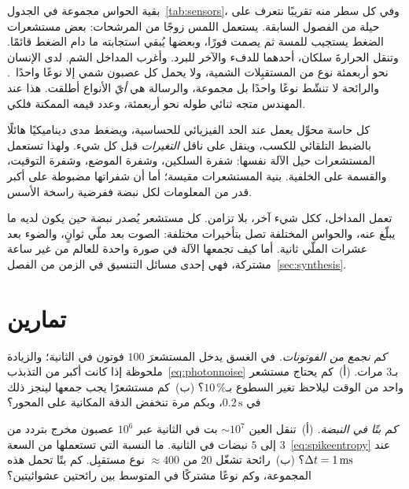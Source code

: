 بقية الحواس مجموعة في الجدول~\ref{tab:sensors}، وفي كل سطر منه تقريبًا نتعرف على حيلة من الفصول السابقة. يستعمل اللمس زوجًا من المرشحات: بعض مستشعرات الضغط يستجيب للمسة ثم يصمت فورًا، وبعضها يُبقي استجابته ما دام الضغط قائمًا. وتنقل الحرارةَ سلكان، أحدهما للدفء والآخر للبرد. وأغرب المداخل الشم. لدى الإنسان نحو أربعمئة نوع من المستقبِلات الشمية، ولا يحمل كل عصبون شمي إلا نوعًا واحدًا~\cite{Mombaerts2004}. والرائحة لا تنشّط نوعًا واحدًا بل مجموعة، والرسالة هي \emph{أيّ} الأنواع أطلقت. هذا عند المهندس متجه ثنائي طوله نحو أربعمئة، وعدد قيمه الممكنة فلكي.

\begin{keyblock}
\begin{proposition}
\label{prop:sensors}
كل حاسة محوِّل يعمل عند الحد الفيزيائي للحساسية، ويضغط مدى ديناميكيًا هائلًا بالضبط التلقائي للكسب، وينقل على ناقل  \emph{التغيرات} قبل كل شيء. ولهذا تستعمل المستشعرات حيل الآلة نفسها: شفرة السلكين، وشفرة الموضع، وشفرة التوقيت، والقسمة على الخلفية. بنية المستشعرات مقيسة؛ أما أن شفراتها مضبوطة على أكبر قدر من المعلومات لكل نبضة ففرضية راسخة الأسس.
\end{proposition}
\end{keyblock}

تعمل المداخل، ككل شيء آخر، بلا تزامن. كل مستشعر يُصدر نبضة حين يكون لديه ما يبلّغ عنه، والحواس المختلفة تصل بتأخيرات مختلفة: الصوت بعد ملّي ثوانٍ، والضوء بعد عشرات الملّي ثانية. أما كيف تجمعها الآلة في صورة واحدة للعالم من غير ساعة مشتركة، فهي إحدى مسائل التنسيق في الزمن من الفصل~\ref{sec:synthesis}.

\section{تمارين}

\begin{exercise}[\lvlA]
\label{ex:11:1}
\emph{كم نجمع من الفوتونات.} في الغسق يدخل المستشعرَ $100$ فوتون في الثانية؛ والزيادة ملحوظة إذا كانت أكبر من التذبذب~\eqref{eq:photonnoise} بـ$3$ مرات. (أ)~كم يحتاج مستشعر واحد من الوقت ليلاحظ تغير السطوع بـ$10\,\%$؟ (ب)~كم مستشعرًا يجب جمعها لينجز ذلك في $0.2\,\text{s}$، وبكم مرة تنخفض الدقة المكانية على المحور؟
\end{exercise}

\begin{exercise}[\lvlA]
\label{ex:11:2}
\emph{كم بتًا في النبضة.} (أ)~تنقل العين $\sim10^7$ بت في الثانية عبر $10^6$ عصبون مخرج بتردد من $3$ إلى $5$ نبضات في الثانية. ما النسبة التي تستعملها من السعة~\eqref{eq:spikeentropy} عند $\Delta t=1\,\text{ms}$؟ (ب)~رائحة تشغّل $20$ من $\approx400$ نوع مستقبِل. كم بتًا تحمل هذه المجموعة، وكم نوعًا مشتركًا في المتوسط بين رائحتين عشوائيتين؟
\end{exercise}

